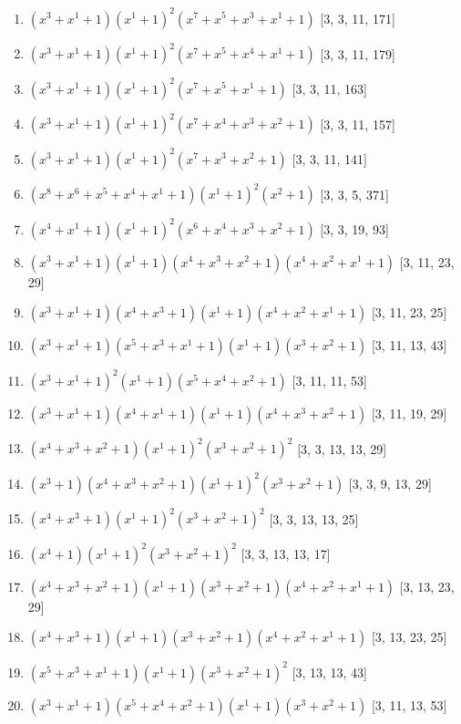 \documentclass[10pt,twocolumn]{article}
\begin{document}
\begin{enumerate}
\item $(x^{3} + x^{1} + 1)(x^{1} + 1)^{2}(x^{7} + x^{5} + x^{3} + x^{1} + 1)$  [3, 3, 11, 171]
\item $(x^{3} + x^{1} + 1)(x^{1} + 1)^{2}(x^{7} + x^{5} + x^{4} + x^{1} + 1)$  [3, 3, 11, 179]
\item $(x^{3} + x^{1} + 1)(x^{1} + 1)^{2}(x^{7} + x^{5} + x^{1} + 1)$  [3, 3, 11, 163]
\item $(x^{3} + x^{1} + 1)(x^{1} + 1)^{2}(x^{7} + x^{4} + x^{3} + x^{2} + 1)$  [3, 3, 11, 157]
\item $(x^{3} + x^{1} + 1)(x^{1} + 1)^{2}(x^{7} + x^{3} + x^{2} + 1)$  [3, 3, 11, 141]
\item $(x^{8} + x^{6} + x^{5} + x^{4} + x^{1} + 1)(x^{1} + 1)^{2}(x^{2} + 1)$  [3, 3, 5, 371]
\item $(x^{4} + x^{1} + 1)(x^{1} + 1)^{2}(x^{6} + x^{4} + x^{3} + x^{2} + 1)$  [3, 3, 19, 93]
\item $(x^{3} + x^{1} + 1)(x^{1} + 1)(x^{4} + x^{3} + x^{2} + 1)(x^{4} + x^{2} + x^{1} + 1)$  [3, 11, 23, 29]
\item $(x^{3} + x^{1} + 1)(x^{4} + x^{3} + 1)(x^{1} + 1)(x^{4} + x^{2} + x^{1} + 1)$  [3, 11, 23, 25]
\item $(x^{3} + x^{1} + 1)(x^{5} + x^{3} + x^{1} + 1)(x^{1} + 1)(x^{3} + x^{2} + 1)$  [3, 11, 13, 43]
\item $(x^{3} + x^{1} + 1)^{2}(x^{1} + 1)(x^{5} + x^{4} + x^{2} + 1)$  [3, 11, 11, 53]
\item $(x^{3} + x^{1} + 1)(x^{4} + x^{1} + 1)(x^{1} + 1)(x^{4} + x^{3} + x^{2} + 1)$  [3, 11, 19, 29]
\item $(x^{4} + x^{3} + x^{2} + 1)(x^{1} + 1)^{2}(x^{3} + x^{2} + 1)^{2}$  [3, 3, 13, 13, 29]
\item $(x^{3} + 1)(x^{4} + x^{3} + x^{2} + 1)(x^{1} + 1)^{2}(x^{3} + x^{2} + 1)$  [3, 3, 9, 13, 29]
\item $(x^{4} + x^{3} + 1)(x^{1} + 1)^{2}(x^{3} + x^{2} + 1)^{2}$  [3, 3, 13, 13, 25]
\item $(x^{4} + 1)(x^{1} + 1)^{2}(x^{3} + x^{2} + 1)^{2}$  [3, 3, 13, 13, 17]
\item $(x^{4} + x^{3} + x^{2} + 1)(x^{1} + 1)(x^{3} + x^{2} + 1)(x^{4} + x^{2} + x^{1} + 1)$  [3, 13, 23, 29]
\item $(x^{4} + x^{3} + 1)(x^{1} + 1)(x^{3} + x^{2} + 1)(x^{4} + x^{2} + x^{1} + 1)$  [3, 13, 23, 25]
\item $(x^{5} + x^{3} + x^{1} + 1)(x^{1} + 1)(x^{3} + x^{2} + 1)^{2}$  [3, 13, 13, 43]
\item $(x^{3} + x^{1} + 1)(x^{5} + x^{4} + x^{2} + 1)(x^{1} + 1)(x^{3} + x^{2} + 1)$  [3, 11, 13, 53]

\end{enumerate}
\end{document}

